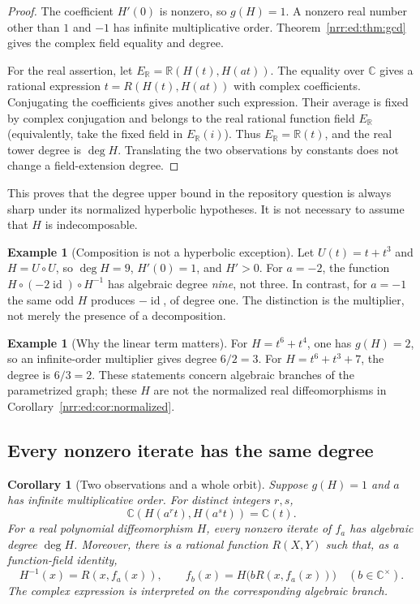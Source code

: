\documentclass[11pt,letterpaper]{article}
\newtheorem{corollary}[theorem]{Corollary}
\theoremstyle{definition}
\newtheorem{example}[theorem]{Example}
\theoremstyle{remark}
\newcommand{\R}{\mathbb R}
\newcommand{\C}{\mathbb C}
\newcommand{\id}{\operatorname{id}}
\begin{document}
\begin{proof}
The coefficient $H'(0)$ is nonzero, so $g(H)=1$. A nonzero real number other than
$1$ and $-1$ has infinite multiplicative order. Theorem~\ref{nrr:ed:thm:gcd} gives the
complex field equality and degree.

For the real assertion, let $E_\R=\R(H(t),H(at))$. The equality over $\C$
gives a rational expression $t=R(H(t),H(at))$ with complex coefficients.
Conjugating the coefficients gives another such expression. Their average is
fixed by complex conjugation and belongs to the real rational function field
$E_\R$ (equivalently, take the fixed field in $E_\R(i)$). Thus
$E_\R=\R(t)$, and the real tower degree is $\deg H$. Translating the two
observations by constants does not change a field-extension degree.
\end{proof}

This proves that the degree upper bound in the repository question is always
sharp under its normalized hyperbolic hypotheses. It is not necessary to assume
that $H$ is indecomposable.

\begin{example}[Composition is not a hyperbolic exception]
Let $U(t)=t+t^3$ and $H=U\circ U$, so $\deg H=9$, $H'(0)=1$, and $H'>0$.
For $a=-2$, the function $H\circ(-2\id)\circ H^{-1}$ has algebraic degree
\emph{nine}, not three. In contrast, for $a=-1$ the same odd $H$ produces
$-\id$, of degree one. The distinction is the multiplier, not merely the
presence of a decomposition.
\end{example}

\begin{example}[Why the linear term matters]
For $H=t^6+t^4$, one has $g(H)=2$, so an infinite-order multiplier gives degree
$6/2=3$. For $H=t^6+t^3+7$, the degree is $6/3=2$. These statements concern
algebraic branches of the parametrized graph; these $H$ are not the normalized
real diffeomorphisms in Corollary~\ref{nrr:ed:cor:normalized}.
\end{example}

\subsection{Every nonzero iterate has the same degree}

\begin{corollary}[Two observations and a whole orbit]
\label{nrr:ed:cor:observations}
Suppose $g(H)=1$ and $a$ has infinite multiplicative order. For distinct integers
$r,s$,
\begin{equation}
 \C(H(a^rt),H(a^st))=\C(t).
 \label{nrr:ed:eq:anytwo}
\end{equation}
For a real polynomial diffeomorphism $H$, every nonzero iterate of $f_a$ has
algebraic degree $\deg H$. Moreover, there is a rational function $R(X,Y)$ such
that, as a function-field identity,
\begin{equation}
 H^{-1}(x)=R(x,f_a(x)),\qquad
 f_b(x)=H\bigl(bR(x,f_a(x))\bigr)\quad(b\in\C^\times).
 \label{nrr:ed:eq:reconstruct}
\end{equation}
The complex expression is interpreted on the corresponding algebraic branch.
\end{corollary}
\end{document}
